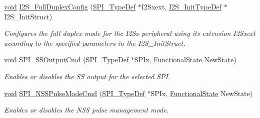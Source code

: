\begin{DoxyCompactItemize}
\hyperlink{group___n_a_m_e_ga18028b8badbf1ea7e704ccac3c488e82}{void} \hyperlink{group___s_p_i___group1_ga60082947bedfe9efc233405be2a7bec2}{I2\-S\-\_\-\-Full\-Duplex\-Config} (\hyperlink{struct_s_p_i___type_def}{S\-P\-I\-\_\-\-Type\-Def} $\ast$I2\-Sxext, \hyperlink{struct_i2_s___init_type_def}{I2\-S\-\_\-\-Init\-Type\-Def} $\ast$I2\-S\-\_\-\-Init\-Struct)
\begin{DoxyCompactList}\small\item\em Configures the full duplex mode for the I2\-Sx peripheral using its extension I2\-Sxext according to the specified parameters in the I2\-S\-\_\-\-Init\-Struct. \end{DoxyCompactList}\item 
\hyperlink{group___n_a_m_e_ga18028b8badbf1ea7e704ccac3c488e82}{void} \hyperlink{group___s_p_i___group1_ga4ec54abdedf6cd17403d853a926d91c1}{S\-P\-I\-\_\-\-S\-S\-Output\-Cmd} (\hyperlink{struct_s_p_i___type_def}{S\-P\-I\-\_\-\-Type\-Def} $\ast$S\-P\-Ix, \hyperlink{group___exported__types_gac9a7e9a35d2513ec15c3b537aaa4fba1}{Functional\-State} New\-State)
\begin{DoxyCompactList}\small\item\em Enables or disables the S\-S output for the selected S\-P\-I. \end{DoxyCompactList}\item 
\hyperlink{group___n_a_m_e_ga18028b8badbf1ea7e704ccac3c488e82}{void} \hyperlink{group___s_p_i___group1_ga25b7bbafdbfba430f0af6cda17fe29fb}{S\-P\-I\-\_\-\-N\-S\-S\-Pulse\-Mode\-Cmd} (\hyperlink{struct_s_p_i___type_def}{S\-P\-I\-\_\-\-Type\-Def} $\ast$S\-P\-Ix, \hyperlink{group___exported__types_gac9a7e9a35d2513ec15c3b537aaa4fba1}{Functional\-State} New\-State)
\begin{DoxyCompactList}\small\item\em Enables or disables the N\-S\-S pulse management mode. \end{DoxyCompactList}\end{DoxyCompactItemize}


